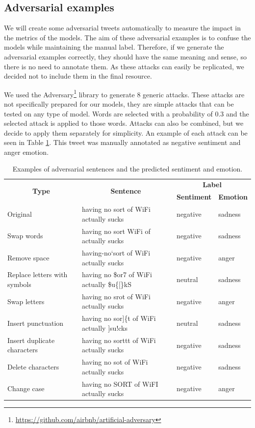 \documentclass[11pt,a4paper]{article}
\begin{document}
\subsection{Adversarial examples}

We will create some adversarial tweets automatically to measure the impact in the metrics of the models. The aim of these adversarial examples is to confuse the models while maintaining the manual label. Therefore, if we generate the adversarial examples correctly, they should have the same meaning and sense, so there is no need to annotate them. As these attacks can easily be replicated, we decided not to include them in the final resource.

We used the Adversary\footnote{\url{https://github.com/airbnb/artificial-adversary}} library to generate 8 generic attacks. These attacks are not specifically prepared for our models, they are simple attacks that can be tested on any type of model. Words are selected with a probability of 0.3 and the selected attack is applied to those words. Attacks can also be combined, but we decide to apply them separately for simplicity. An example of each attack can be seen in Table \ref{tab:adversarial}. This tweet was manually annotated as negative sentiment and anger emotion.

\begin{table}[ht]
\centering
\begin{tabular}{llll}
\hline
\multicolumn{1}{c}{\multirow{2}{*}{\textbf{Type}}} & \multicolumn{1}{c}{\multirow{2}{*}{\textbf{Sentence}}} & \multicolumn{2}{c}{\textbf{Label}} \\ \cline{3-4} 
\multicolumn{1}{c}{} & \multicolumn{1}{c}{} & \multicolumn{1}{c}{\textbf{Sentiment}} & \multicolumn{1}{c}{\textbf{Emotion}} \\ \hline
Original & having no sort of WiFi actually sucks & negative & sadness \\
Swap words & having no sort WiFi of actually sucks & negative & sadness \\
Remove space & having-no`sort of WiFi actually sucks & negative & anger \\
Replace letters with symbols & having no \$or7 of WiFi actually \$u\{[\}kS & neutral & sadness \\
Swap letters & having no srot of WiFi actually sucks & negative & anger \\
Insert punctuation & having no sor{]}\{t of WiFi actually {]}su!cks & neutral & sadness \\
Insert duplicate characters & having no sorttt of WiFi actually sucks & negative & sadness \\
Delete characters & having no sot of WiFi actually sucks & negative & sadness \\
Change case & having no SORT of WiFI actually sucks & negative & anger \\ \hline
\end{tabular}
\caption{Examples of adversarial sentences and the predicted sentiment and emotion.}
\label{tab:adversarial}
\end{table}
\end{document}
